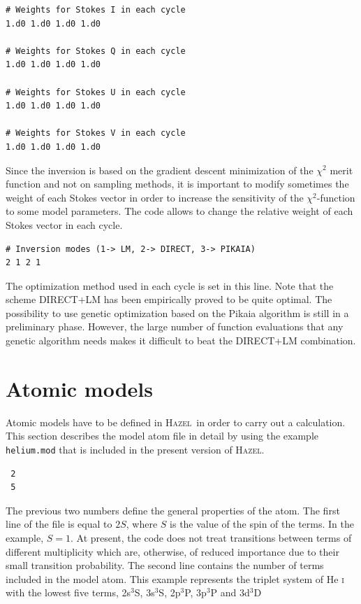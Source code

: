 \documentclass[12pt]{article}
\def\H{\textsc{Hazel}}
\begin{document}
\begin{verbatim}
# Weights for Stokes I in each cycle
1.d0 1.d0 1.d0 1.d0

# Weights for Stokes Q in each cycle
1.d0 1.d0 1.d0 1.d0

# Weights for Stokes U in each cycle
1.d0 1.d0 1.d0 1.d0

# Weights for Stokes V in each cycle
1.d0 1.d0 1.d0 1.d0
\end{verbatim}
Since the inversion is based on the gradient descent minimization of the $\chi^2$ merit function and not on
sampling methods, it is important to modify sometimes the weight of each Stokes vector in order to
increase the sensitivity of the $\chi^2$-function to some model parameters. The code allows to change the relative
weight of each Stokes vector in each cycle.

\begin{verbatim}
# Inversion modes (1-> LM, 2-> DIRECT, 3-> PIKAIA)
2 1 2 1
\end{verbatim}
The optimization method used in each cycle is set in this line. Note that the scheme DIRECT+LM has been
empirically proved to be quite optimal. The possibility to use genetic optimization based on the Pikaia
algorithm is still in a preliminary phase. However, the large number of function evaluations that any genetic
algorithm needs makes it difficult to beat the DIRECT+LM combination.


\section{Atomic models}
\label{sec:atomic_model}
Atomic models have to be defined in \H\ in order to carry out a calculation. This
section describes the model atom file in detail by using the example \texttt{helium.mod}
that is included in the present version of \H.

\begin{verbatim}
 2
 5
\end{verbatim}
The previous two numbers define the general properties of the atom.
The first line of the file is equal to $2S$, where $S$ is the value of the spin of the
terms. In the example, $S=1$. At present, the code does not treat transitions between terms of different multiplicity which are,
otherwise, of reduced importance due to their small transition probability. The second
line contains the number of terms included in the model atom. This example represents
the triplet system of He \textsc{i} with the lowest five terms, 2s$^3$S, 3s$^3$S, 2p$^3$P, 3p$^3$P and 3d$^3$D
\end{document}
